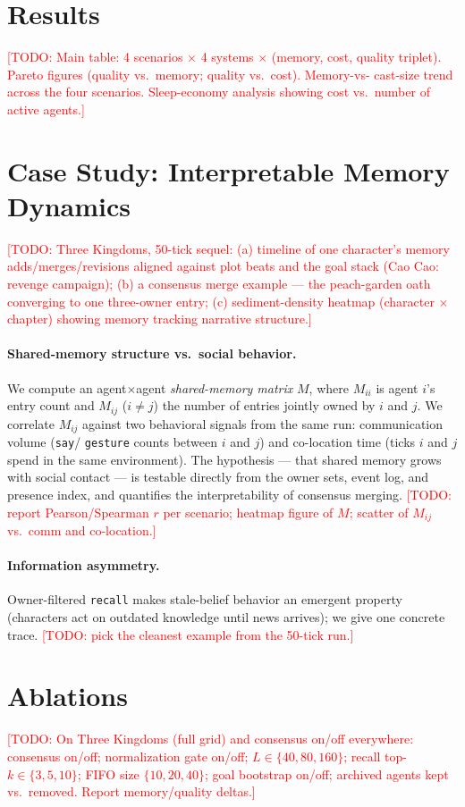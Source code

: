 \documentclass[11pt]{article}
\newcommand{\todo}[1]{\textcolor{red}{[TODO: #1]}}
\begin{document}
\section{Results}
\label{sec:results}
\todo{Main table: 4 scenarios $\times$ 4 systems $\times$ (memory, cost, quality
triplet). Pareto figures (quality vs.\ memory; quality vs.\ cost). Memory-vs-%
cast-size trend across the four scenarios. Sleep-economy analysis showing cost
vs.\ number of active agents.}

\section{Case Study: Interpretable Memory Dynamics}
\label{sec:case}
\todo{Three Kingdoms, 50-tick sequel: (a) timeline of one character's memory
adds/merges/revisions aligned against plot beats and the goal stack (Cao Cao:
revenge campaign); (b) a consensus merge example --- the peach-garden oath
converging to one three-owner entry; (c) sediment-density heatmap (character
$\times$ chapter) showing memory tracking narrative structure.}

\paragraph{Shared-memory structure vs.\ social behavior.}
We compute an agent$\times$agent \emph{shared-memory matrix} $M$, where
$M_{ii}$ is agent $i$'s entry count and $M_{ij}$ ($i\neq j$) the number of
entries jointly owned by $i$ and $j$. We correlate $M_{ij}$ against two
behavioral signals from the same run: communication volume (\texttt{say}/%
\texttt{gesture} counts between $i$ and $j$) and co-location time (ticks $i$
and $j$ spend in the same environment). The hypothesis --- that shared memory
grows with social contact --- is testable directly from the owner sets, event
log, and presence index, and quantifies the interpretability of consensus
merging. \todo{report Pearson/Spearman $r$ per scenario; heatmap figure of $M$;
scatter of $M_{ij}$ vs.\ comm and co-location.}

\paragraph{Information asymmetry.}
Owner-filtered \texttt{recall} makes stale-belief behavior an emergent property
(characters act on outdated knowledge until news arrives); we give one
concrete trace. \todo{pick the cleanest example from the 50-tick run.}

\section{Ablations}
\label{sec:ablations}
\todo{On Three Kingdoms (full grid) and consensus on/off everywhere:
consensus on/off; normalization gate on/off; $L \in \{40, 80, 160\}$;
recall top-$k \in \{3,5,10\}$; FIFO size $\{10,20,40\}$; goal bootstrap on/off;
archived agents kept vs.\ removed. Report memory/quality deltas.}
\end{document}
